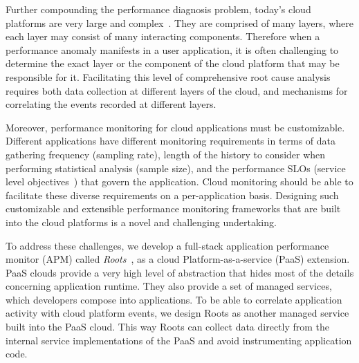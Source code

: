 Further compounding the performance
diagnosis problem, today's cloud platforms are very 
large and complex~\cite{DaCunhaRodrigues:2016:MCC:2851613.2851619,Ibidunmoye:2015:PAD:2808687.2791120}. 
They are
comprised of many layers, where each layer may consist of many interacting components.
Therefore when a performance anomaly manifests in a user application, it is
often challenging
to determine the exact layer or the component of the cloud platform that may be responsible for it. 
Facilitating this level of comprehensive root cause analysis requires
both data collection at different layers of the cloud, and mechanisms for correlating 
the events recorded at different layers. 

Moreover, performance monitoring for cloud applications must be customizable. Different
applications have different monitoring requirements in terms of data gathering frequency (sampling rate), 
length of the history to consider when performing statistical analysis (sample size), and the performance 
SLOs (service level objectives~\cite{Keller:2003:WFS:635430.635442}) that govern the application.
Cloud monitoring should be able to facilitate these diverse requirements on a
per-application basis.
Designing such customizable and extensible performance
monitoring frameworks that are built into the cloud platforms is a novel and challenging undertaking.

To address these challenges, we develop 
a full-stack application performance
monitor (APM) called \textit{Roots}~\cite{Jayathilaka:2017:PMR:3038912.3052649}, as a cloud Platform-as-a-service (PaaS) extension.
PaaS clouds provide a very high level of abstraction that hides most of the details concerning application
runtime. They also provide a set of managed services, which developers compose into applications.
To be able to correlate application activity with cloud platform events,
we design Roots as another managed service built into the PaaS cloud. 
This way Roots can collect data
directly from the internal service implementations of the PaaS and
avoid instrumenting application code.

